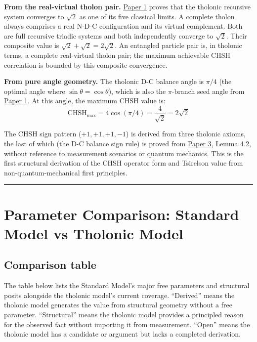 \documentclass[12pt]{article}
\begin{document}
\textbf{From the real-virtual tholon pair.}
\href{https://github.com/baardev/truevalue/blob/main/docnav/Research/papers/1_recursive-tholonic-five-constants/1_recursive-tholonic-five-constants.pdf}{Paper
1} proves that the tholonic recursive system converges to \(\sqrt{2}\)
as one of its five classical limits. A complete tholon always comprises
a real N-D-C configuration and its virtual complement. Both are full
recursive triadic systems and both independently converge to
\(\sqrt{2}\). Their composite value is
\(\sqrt{2} + \sqrt{2} = 2\sqrt{2}\). An entangled particle pair is, in
tholonic terms, a complete real-virtual tholon pair; the maximum
achievable CHSH correlation is bounded by this composite convergence.

\textbf{From pure angle geometry.} The tholonic D-C balance angle is
\(\pi/4\) (the optimal angle where \(\sin\theta = \cos\theta\)), which
is also the \(\pi\)-branch seed angle from
\href{https://github.com/baardev/truevalue/blob/main/docnav/Research/papers/1_recursive-tholonic-five-constants/1_recursive-tholonic-five-constants.pdf}{Paper
1}. At this angle, the maximum CHSH value is:
\[\text{CHSH}_{\max} = 4\cos(\pi/4) = \frac{4}{\sqrt{2}} = 2\sqrt{2}\]

The CHSH sign pattern (\(+1, +1, +1, -1\)) is derived from three
tholonic axioms, the last of which (the D-C balance sign rule) is proved
from
\href{https://github.com/baardev/truevalue/blob/main/docnav/Research/papers/3_minimal-recursive-triadic-framework/3_minimal-recursive-triadic-framework.pdf}{Paper
3}, Lemma 4.2, without reference to measurement scenarios or quantum
mechanics. This is the first structural derivation of the CHSH operator
form and Tsirelson value from non-quantum-mechanical first principles.

\begin{center}\rule{0.5\linewidth}{0.5pt}\end{center}

\section{Parameter Comparison: Standard Model vs Tholonic Model}\label{parameter-comparison-standard-model-vs-tholonic-model}

\subsection{Comparison table}\label{comparison-table}

The table below lists the Standard Model's major free parameters and
structural posits alongside the tholonic model's current coverage.
``Derived'' means the tholonic model generates the value from structural
geometry without a free parameter. ``Structural'' means the tholonic
model provides a principled reason for the observed fact without
importing it from measurement. ``Open'' means the tholonic model has a
candidate or argument but lacks a completed derivation.
\end{document}
